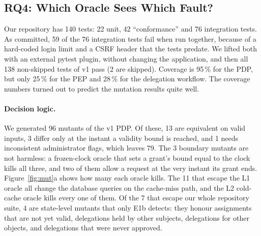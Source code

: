 \subsection{RQ4: Which Oracle Sees Which Fault?}
\label{sec:adequacy}

Our repository has 140 tests: 22 unit, 42 ``conformance'' and 76 integration tests. As committed, 59 of the 76
integration tests fail when run together, because of a hard-coded login limit and a CSRF header that the tests
predate. We lifted both with an external pytest plugin, without changing the application, and then all 138
non-skipped tests of v1 pass (2 are skipped). Coverage is 95\,\% for the PDP, but only 25\,\% for the PEP and 28\,\% for the delegation
workflow. The coverage numbers turned out to predict the mutation results quite well.

\paragraph{Decision logic.} We generated 96 mutants of the v1 PDP. Of these, 13 are equivalent on valid inputs,
3 differ only at the instant a validity bound is reached, and 1 needs inconsistent administrator flags, which
leaves 79. The 3 boundary mutants are not harmless: a frozen-clock oracle that sets a grant's bound equal to the
clock kills all three, and two of them allow a request at the very instant its grant ends.
Figure~\ref{fig:mut}a shows how many each oracle kills. The 11 that escape the L1 oracle all change the database
queries on the cache-miss path, and the L2 cold-cache oracle kills every one of them. Of the 7 that escape our
whole repository suite, 4 are state-level mutants that only E1b detects: they honour assignments that are not yet
valid, delegations held by other subjects, delegations for other objects, and delegations that were never
approved.

